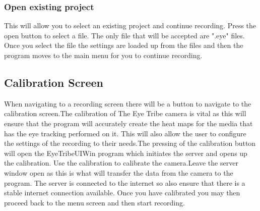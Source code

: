 \subsubsection{Open existing project} 
This will allow you to select an existing project and continue recording. Press the open button to select a file. The only file that will be accepted are ".eye" files. Once you select the file the settings are loaded up from the files and then the program moves to the main menu for you to continue recording.

\subsection{Calibration Screen}
When navigating to a recording screen there will be a button to navigate to the calibration screen.The calibration of The Eye Tribe camera is vital as this will ensure that the program will accurately create the heat maps for the media that has the eye tracking performed on it. This will also allow the user to configure the settings of the recording to their needs.The pressing of the calibration button will open the EyeTribeUIWin program which initiates the server and opens up the calibration. Use the calibration to calibrate the camera.Leave the server window open as this is what will transfer the data from the camera to the program. The server is connected to the internet so also ensure that there is a stable internet connection available. Once you have calibrated you may then proceed back to the menu screen and then start recording.

